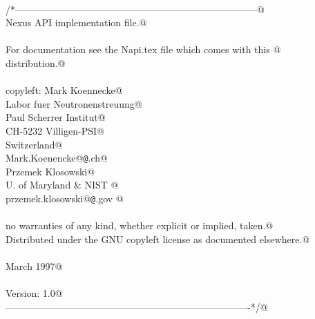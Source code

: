 \documentclass[12pt]{article}
\begin{document}
\begin{flushleft} \small
\begin{minipage}{\linewidth} \label{scrap36}
\vspace{-1ex}
\begin{list}{}{} \item
\mbox{}\verb@@\\
\mbox{}\verb@/*---------------------------------------------------------------------------@\\
\mbox{}\verb@                         Nexus API implementation file.@\\
\mbox{}\verb@@\\
\mbox{}\verb@  For documentation see the Napi.tex file which comes with this @\\
\mbox{}\verb@  distribution.@\\
\mbox{}\verb@@\\
\mbox{}\verb@  copyleft: Mark Koennecke@\\
\mbox{}\verb@            Labor fuer Neutronenstreuung@\\
\mbox{}\verb@            Paul Scherrer Institut@\\
\mbox{}\verb@            CH-5232 Villigen-PSI@\\
\mbox{}\verb@            Switzerland@\\
\mbox{}\verb@            Mark.Koenencke@{\tt @}\verb@psi.ch@\\
\mbox{}\verb@            Przemek Klosowski@\\
\mbox{}\verb@            U. of Maryland & NIST        @\\
\mbox{}\verb@            przemek.klosowski@{\tt @}\verb@nist.gov @\\
\mbox{}\verb@@\\
\mbox{}\verb@  no warranties of any kind, whether explicit or implied, taken.@\\
\mbox{}\verb@  Distributed under the GNU copyleft license as documented elsewhere.@\\
\mbox{}\verb@@\\
\mbox{}\verb@  March 1997@\\
\mbox{}\verb@@\\
\mbox{}\verb@  Version: 1.0@\\
\mbox{}\verb@----------------------------------------------------------------------------*/@\\
\end{list}
\vspace{-2ex}
\end{minipage}\\[4ex]
\end{flushleft}
\end{document}
